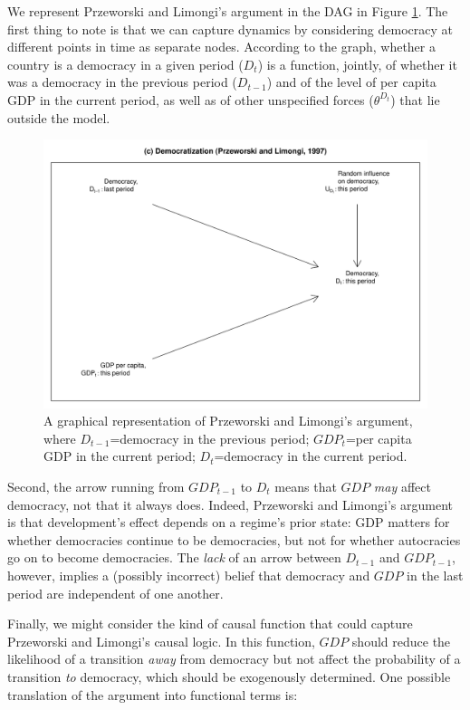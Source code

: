 \documentclass[
  12pt,
]{book}
\begin{document}
We represent Przeworski and Limongi's argument in the DAG in Figure \ref{fig:DAGPL}. The first thing to note is that we can capture dynamics by considering democracy at different points in time as separate nodes. According to the graph, whether a country is a democracy in a given period (\(D_t\)) is a function, jointly, of whether it was a democracy in the previous period (\(D_{t-1}\)) and of the level of per capita GDP in the current period, as well as of other unspecified forces (\(\theta^{D_t}\)) that lie outside the model.

\begin{figure}

{\centering \includegraphics[width=.7\textwidth]{ii_files/figure-latex/DAGPL-1} 

}

\caption{A graphical representation of Przeworski and Limongi's argument, where $D_{t-1}$=democracy in the previous period; $GDP_t$=per capita GDP in the current period; $D_t$=democracy in the current period.}\label{fig:DAGPL}
\end{figure}

Second, the arrow running from \(GDP_{t-1}\) to \(D_t\) means that \(GDP\) \emph{may} affect democracy, not that it always does. Indeed, Przeworski and Limongi's argument is that development's effect depends on a regime's prior state: GDP matters for whether democracies continue to be democracies, but not for whether autocracies go on to become democracies. The \emph{lack} of an arrow between \(D_{t-1}\) and \(GDP_{t-1}\), however, implies a (possibly incorrect) belief that democracy and \(GDP\) in the last period are independent of one another.

Finally, we might consider the kind of causal function that could capture Przeworski and Limongi's causal logic. In this function, \(GDP\) should reduce the likelihood of a transition \emph{away} from democracy but not affect the probability of a transition \emph{to} democracy, which should be exogenously determined. One possible translation of the argument into functional terms is:
\end{document}
